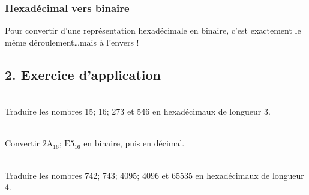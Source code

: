 \documentclass[a4paper,17pt]{extarticle}
\newenvironment{eleve}%
{\begin{activite}\color{noiramu}\\[-0.5cm]}
{\end{activite}}
\begin{document}
    \hypertarget{hexaduxe9cimal-vers-binaire}{%
\subsubsection{Hexadécimal vers
binaire}\label{hexaduxe9cimal-vers-binaire}}
\begin{retenir}
    Pour convertir d'une représentation hexadécimale en binaire, c'est
exactement le même déroulement\ldots mais à l'envers !

        \end{retenir}
    \hypertarget{exercice-dapplication}{%
\subsection{2. Exercice d'application}\label{exercice-dapplication}}
\begin{eleve}
    Traduire les nombres 15; 16; 273 et 546 en hexadécimaux de longueur 3.
        
        \end{eleve}\begin{eleve}
    Convertir \(\text{2A}_{16}\); \(\text{E5}_{16}\) en binaire, puis en
décimal.
        
        \end{eleve}\begin{eleve}
    Traduire les nombres 742; 743; 4095; 4096 et 65535 en hexadécimaux de
longueur 4.
        
        \end{eleve}

    
    
    
\end{document}
